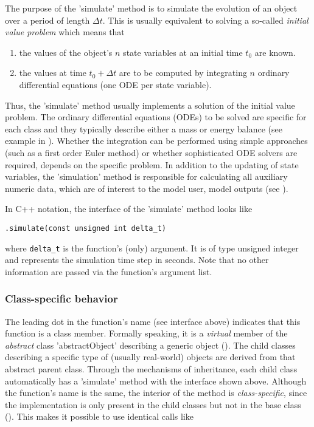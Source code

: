 The purpose of the 'simulate' method is to simulate the evolution of an object over a period of length $\Delta t$. This is usually equivalent to solving a so-called \emph{initial value problem} which means that

\begin{enumerate}
  \item the values of the object's $n$ state variables at an initial time $t_0$ are known.
  \item the values at time $t_0 + \Delta t$ are to be computed by integrating $n$ ordinary differential equations (one ODE per state variable).
\end{enumerate}

Thus, the 'simulate' method usually implements a solution of the initial value problem. The ordinary differential equations (ODEs) to be solved are specific for each class and they typically describe either a mass or energy balance (see example in ). Whether the integration can be performed using simple approaches (such as a first order Euler method) or whether sophisticated ODE solvers \citep[see \eg{}][]{Press2002} are required, depends on the specific problem. In addition to the updating of state variables, the 'simulation' method is responsible for calculating all auxiliary numeric data, which are of interest to the model user, \ie{} model outputs (see ).

In C++ notation, the interface of the 'simulate' method looks like

\medskip
{\small \verb!.simulate(const unsigned int delta_t)!}
\medskip

where \verb!delta_t! is the function's (only) argument. It is of type unsigned integer and represents the simulation time step in seconds. Note that no other information are passed via the function's argument list.

\subsubsection*{Class-specific behavior}
The leading dot in the function's name (see interface above) indicates that this function is a class member. Formally speaking, it is a \emph{virtual} member of the \emph{abstract} class 'abstractObject' describing a generic object (). The child classes describing a specific type of (usually real-world) objects are derived from that abstract parent class. Through the mechanisms of inheritance, each child class automatically has a 'simulate' method with the interface shown above. Although the function's name is the same, the interior of the method is \emph{class-specific}, since the implementation is only present in the child classes but not in the base class (). This makes it possible to use identical calls like

